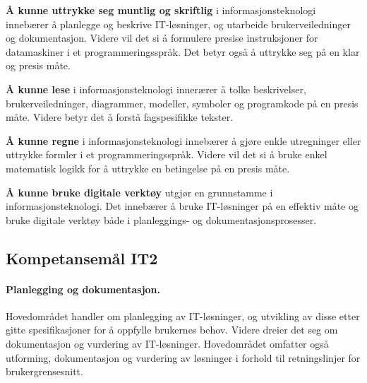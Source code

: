 \documentclass[%
oneside,                 %
final,                   %
12pt]{article}
\newenvironment{block_mdfboxadmon}[1][]{
\begin{block_mdfboxmdframed}[frametitle=#1]
}
{
\end{block_mdfboxmdframed}
}
\begin{document}
\begin{block_mdfboxadmon}[]

\textbf{Å kunne uttrykke seg muntlig og skriftlig} i informasjonsteknologi
innebærer å planlegge og beskrive IT-løsninger, og utarbeide
brukerveiledninger og dokumentasjon. Videre vil det si å formulere
presise instruksjoner for datamaskiner i et programmeringsspråk. Det
betyr også å uttrykke seg på en klar og presis måte.

\textbf{Å kunne lese} i informasjonsteknologi innerærer å tolke beskrivelser,
brukerveiledninger, diagrammer, modeller, symboler og programkode på
en presis måte. Videre betyr det å forstå fagspesifikke tekster.

\textbf{Å kunne regne} i informasjonsteknologi innebærer å gjøre enkle
utregninger eller uttrykke formler i et programmeringsspråk. Videre
vil det si å bruke enkel matematisk logikk for å uttrykke en
betingelse på en presis måte.

\textbf{Å kunne bruke digitale verktøy} utgjør en grunnstamme i
informasjonsteknologi. Det innebærer å bruke IT-løsninger på en
effektiv måte og bruke digitale verktøy både i planleggings- og
dokumentasjonsprosesser.
\end{block_mdfboxadmon}



\subsection{Kompetansemål IT2}
\label{section:kompetansemål}

\paragraph{Planlegging og dokumentasjon.}
Hovedområdet handler om planlegging av IT-løsninger, og utvikling av
disse etter gitte spesifikasjoner for å oppfylle brukernes
behov. Videre dreier det seg om dokumentasjon og vurdering av
IT-løsninger. Hovedområdet omfatter også utforming, dokumentasjon og
vurdering av løsninger i forhold til retningslinjer for
brukergrensesnitt.
\end{document}
